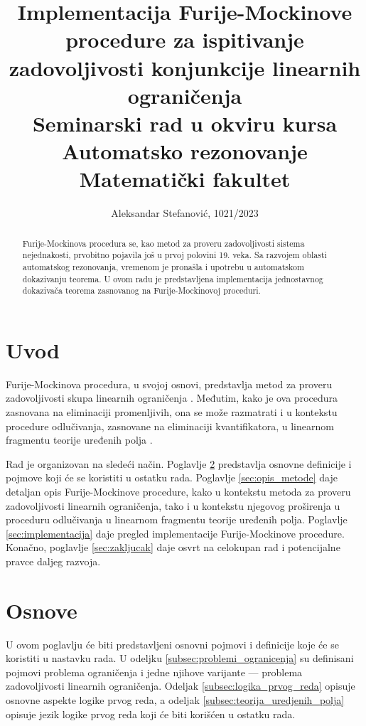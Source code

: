 \documentclass[a4paper,10pt]{article}
\title{Implementacija Furije-Mockinove procedure za ispitivanje zadovoljivosti konjunkcije linearnih ograničenja\\ \small{Seminarski rad u okviru kursa\\Automatsko rezonovanje\\Matematički fakultet}}
\author{Aleksandar Stefanović, 1021/2023}
\begin{document}
\maketitle

\begin{abstract}

Furije-Mockinova procedura se, kao metod za proveru zadovoljivosti sistema nejednakosti, prvobitno pojavila još u prvoj polovini 19. veka. Sa razvojem oblasti automatskog rezonovanja, vremenom je pronašla i upotrebu u automatskom dokazivanju teorema. U ovom radu je predstavljena implementacija jednostavnog dokazivača teorema zasnovanog na Furije-Mockinovoj proceduri.

\end{abstract}

\tableofcontents

\newpage

\section{Uvod}

Furije-Mockinova procedura, u svojoj osnovi, predstavlja metod za proveru zadovoljivosti skupa linearnih ograničenja \cite{theory_of_linear_and_integer_programming}. Međutim, kako je ova procedura zasnovana na eliminaciji promenljivih, ona se može razmatrati i u kontekstu procedure odlučivanja, zasnovane na eliminaciji kvantifikatora, u linearnom fragmentu teorije uređenih polja \cite{quantifier_elimination_fourier_motzkin}.

Rad je organizovan na sledeći način. Poglavlje \ref{sec:osnove} predstavlja osnovne definicije i pojmove koji će se koristiti u ostatku rada. Poglavlje \ref{sec:opis_metode} daje detaljan opis Furije-Mockinove procedure, kako u kontekstu metoda za proveru zadovoljivosti linearnih ograničenja, tako i u kontekstu njegovog proširenja u proceduru odlučivanja u linearnom fragmentu teorije uređenih polja. Poglavlje \ref{sec:implementacija} daje pregled implementacije Furije-Mockinove procedure. Konačno, poglavlje \ref{sec:zakljucak} daje osvrt na celokupan rad i potencijalne pravce daljeg razvoja.

\section{Osnove}
\label{sec:osnove}

U ovom poglavlju će biti predstavljeni osnovni pojmovi i definicije koje će se koristiti u nastavku rada. U odeljku \ref{subsec:problemi_ogranicenja} su definisani pojmovi problema ograničenja i jedne njihove varijante --- problema zadovoljivosti linearnih ograničenja. Odeljak \ref{subsec:logika_prvog_reda} opisuje osnovne aspekte logike prvog reda, a odeljak \ref{subsec:teorija_uredjenih_polja} opisuje jezik logike prvog reda koji će biti korišćen u ostatku rada.
\end{document}
